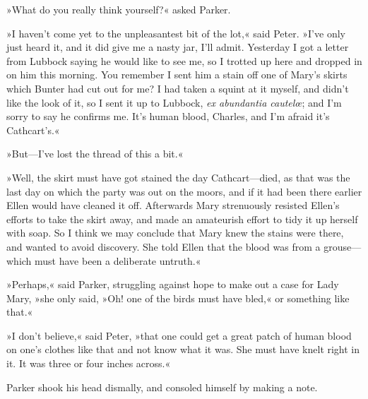 »What do you really think yourself?« asked Parker.

»I haven't come yet to the unpleasantest bit of the lot,« said Peter. »I've only just heard it, and it did give me a nasty jar, I'll admit.  Yesterday I got a letter from Lubbock saying he would like to see me, so I trotted up here and dropped in on him this morning. You remember I sent him a stain off one of Mary's skirts which Bunter had cut out for me? I had taken a squint at it myself, and didn't like the look of it, so I sent it up to Lubbock, \textit{ex abundantia cautelœ}; and I'm sorry to say he confirms me. It's human blood, Charles, and I'm afraid it's Cathcart's.«

»But\allowbreak---\allowbreak I've lost the thread of this a bit.«

»Well, the skirt must have got stained the day Cathcart\allowbreak---\allowbreak died, as that was the last day on which the party was out on the moors, and if it had been there earlier Ellen would have cleaned it off. Afterwards Mary strenuously resisted Ellen's efforts to take the skirt away, and made an amateurish effort to tidy it up herself with soap. So I think we may conclude that Mary knew the stains were there, and wanted to avoid discovery. She told Ellen that the blood was from a grouse\allowbreak---\allowbreak which must have been a deliberate untruth.«

»Perhaps,« said Parker, struggling against hope to make out a case for Lady Mary, »she only said, »Oh! one of the birds must have bled,« or something like that.«

»I don't believe,« said Peter, »that one could get a great patch of human blood on one's clothes like that and not know what it was. She must have knelt right in it. It was three or four inches across.«

Parker shook his head dismally, and consoled himself by making a note.

